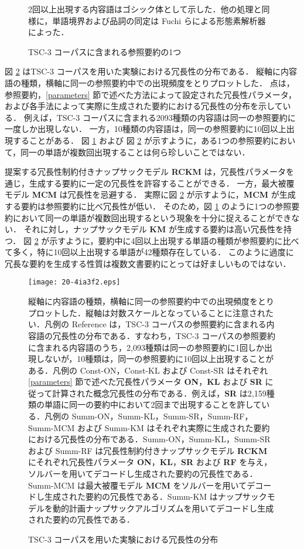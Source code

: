 \documentclass[japanese]{jnlp_1.4}
\begin{document}
\begin{figure}[b]

\caption{TSC-3 コーパスに含まれる参照要約の1つ}
\label{fg:exref}
\small
2回以上出現する内容語はゴシック体として示した．他の処理と同様に，単語境界および品詞の同定は Fuchi らによる形態素解析器 \protect \cite{fuchi98} によった．
\end{figure}

図 \ref{fg:dist_news} はTSC-3 コーパスを用いた実験における冗長性の分布である．
縦軸に内容語の種類，横軸に同一の参照要約中での出現頻度をとりプロットした．
点は，参照要約，\ref{parameters} 節で述べた方法によって設定された冗長性パラメータ，および各手法によって実際に生成された要約における冗長性の分布を示している．
例えば，TSC-3 コーパスに含まれる2093種類の内容語は同一の参照要約に一度しか出現しない．
一方，10種類の内容語は，同一の参照要約に10回以上出現することがある．
図 \ref{fg:exref} および 図 \ref{fg:dist_news} が示すように，ある1つの参照要約において，同一の単語が複数回出現することは何ら珍しいことではない．

提案する冗長性制約付きナップサックモデル {\bf RCKM } は，冗長性パラメータを通じ，生成する要約に一定の冗長性を許容することができる．
一方，最大被覆モデル {\bf MCM} は冗長性を忌避する．
実際に図 \ref{fg:dist_news} が示すように，{\bf MCM} が生成する要約は参照要約に比べ冗長性が低い．
そのため，図 \ref{fg:exref} のように1つの参照要約において同一の単語が複数回出現するという現象を十分に捉えることができない．
それに対し，ナップサックモデル {\bf KM} が生成する要約は高い冗長性を持つ．
図 \ref{fg:dist_news} が示すように，要約中に4回以上出現する単語の種類が参照要約に比べて多く，特に10回以上出現する単語が42種類存在している．
このように過度に冗長な要約を生成する性質は複数文書要約にとっては好ましいものではない．

\begin{figure}[t]
\begin{center}
\texttt{[image: 20-4ia3f2.eps]}
\end{center}
\caption{TSC-3 コーパスを用いた実験における冗長性の分布}
\label{fg:dist_news}
\small
縦軸に内容語の種類，横軸に同一の参照要約中での出現頻度をとりプロットした．縦軸は対数スケールとなっていることに注意されたい．凡例の Reference は，TSC-3 コーパスの参照要約に含まれる内容語の冗長性の分布である．すなわち，TSC-3 コーパスの参照要約に含まれる内容語のうち，2,093種類は同一の参照要約に1回しか出現しないが，10種類は，同一の参照要約に10回以上出現することがある．凡例の Const-ON，Const-KL および Const-SR はそれぞれ \ref{parameters} 節で述べた冗長性パラメータ {\bf ON}，{\bf KL} および {\bf SR} に従って計算された概念冗長性の分布である．例えば，{\bf SR} は2,159種類の単語に同一の要約中において2回まで出現することを許している．凡例の Summ-ON，Summ-KL，Summ-SR，Summ-RF，Summ-MCM および Summ-KM はそれぞれ実際に生成された要約における冗長性の分布である．Summ-ON，Summ-KL，Summ-SR および Summ-RF は冗長性制約付きナップサックモデル {\bf RCKM} にそれぞれ冗長性パラメータ {\bf ON}，{\bf KL}，{\bf SR} および {\bf RF} を与え，ソルバーを用いてデコードし生成された要約の冗長性である．Summ-MCM は最大被覆モデル {\bf MCM} をソルバーを用いてデコードし生成された要約の冗長性である．Summ-KM はナップサックモデルを動的計画ナップサックアルゴリズムを用いてデコードし生成された要約の冗長性である．
\end{figure}
\end{document}
